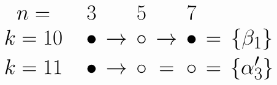 \documentclass{article}
\begin{document}
\(
\begin{tikzcd}[
nodes={font=\Huge,inner sep=1pt},
row sep=0.1cm,
column sep=0.3cm
]
n= && & 3 & & 5 & & 7 & & \\
&& &&  \\ \\
k=10 &&& \bullet &\rightarrow& \circ &\rightarrow& \bullet &=& \{\beta_1\}  \\ \\
k=11 &&& \bullet &\rightarrow& \circ &=& \circ &=& \{\alpha'_3\}  \\ \\
\\
\end{tikzcd}
\)
\end{document}
